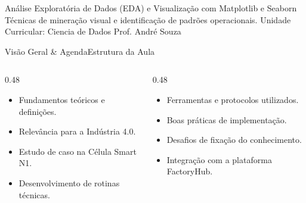 
\senaicover
  {Análise Exploratória de Dados (EDA) e Visualização com Matplotlib e Seaborn}
  {Técnicas de mineração visual e identificação de padrões operacionais.}
  {Unidade Curricular: Ciencia de Dados}
  {Prof. André Souza}

\begin{senaiframe}{Visão Geral \& Agenda}{Estrutura da Aula}
  \begin{columns}[t]
    \begin{column}{0.48\textwidth}
      \begin{tcolorbox}[senaibluecard, title={1. Conceitos Chave}]
        \begin{itemize}
          \item Fundamentos teóricos e definições.
          \item Relevância para a Indústria 4.0.
        \end{itemize}
      \end{tcolorbox}
      \vspace{4pt}
      \begin{tcolorbox}[senaiambercard, title={3. Aplicação Prática}]
        \begin{itemize}
          \item Estudo de caso na Célula Smart N1.
          \item Desenvolvimento de rotinas técnicas.
        \end{itemize}
      \end{tcolorbox}
    \end{column}
    \begin{column}{0.48\textwidth}
      \begin{tcolorbox}[senairedcard, title={2. Detalhamento Técnico}]
        \begin{itemize}
          \item Ferramentas e protocolos utilizados.
          \item Boas práticas de implementação.
        \end{itemize}
      \end{tcolorbox}
      \vspace{4pt}
      \begin{tcolorbox}[senaigreencard, title={4. Exercícios \& Avaliação}]
        \begin{itemize}
          \item Desafios de fixação do conhecimento.
          \item Integração com a plataforma FactoryHub.
        \end{itemize}
      \end{tcolorbox}
    \end{column}
  \end{columns}
\end{senaiframe}

